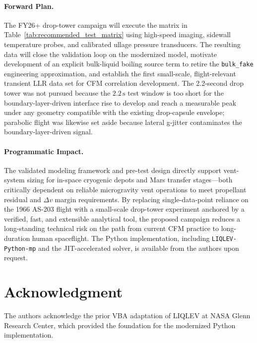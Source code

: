 \documentclass[conf]{new-aiaa}
\begin{document}
\paragraph{Forward Plan.} The FY26+ drop-tower campaign will execute the matrix in Table~\ref{tab:recommended_test_matrix} using high-speed imaging, sidewall temperature probes, and calibrated ullage pressure transducers. The resulting data will close the validation loop on the modernized model, motivate development of an explicit bulk-liquid boiling source term to retire the \texttt{bulk\_fake} engineering approximation, and establish the first small-scale, flight-relevant transient LLR data set for CFM correlation development. The 2.2-second drop tower was not pursued because the $2.2\,\text{s}$ test window is too short for the boundary-layer-driven interface rise to develop and reach a measurable peak under any geometry compatible with the existing drop-capsule envelope; parabolic flight was likewise set aside because lateral g-jitter contaminates the boundary-layer-driven signal.

\paragraph{Programmatic Impact.} The validated modeling framework and pre-test design directly support vent-system sizing for in-space cryogenic depots and Mars transfer stages---both critically dependent on reliable microgravity vent operations to meet propellant residual and $\Delta v$ margin requirements. By replacing single-data-point reliance on the 1966 AS-203 flight with a small-scale drop-tower experiment anchored by a verified, fast, and extensible analytical tool, the proposed campaign reduces a long-standing technical risk on the path from current CFM practice to long-duration human spaceflight. The Python implementation, including \texttt{LIQLEV-Python-mp} and the JIT-accelerated solver, is available from the authors upon request.

\section*{Acknowledgment}

The authors acknowledge the prior VBA adaptation of LIQLEV at NASA Glenn Research Center, which provided the foundation for the modernized Python implementation.


\end{document}
